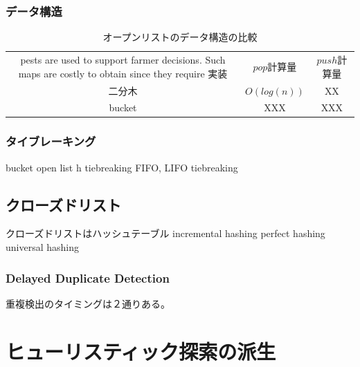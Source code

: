 \documentclass[b5paper]{report}
\begin{document}
\subsection{データ構造}
\begin{table}
\caption{オープンリストのデータ構造の比較}
\label{tbl:open-list-data-structure}
\begin{adjustbox}{width=\textwidth}
\begin{tabular}{ccc}pests are used to
support farmer decisions. Such maps are costly to obtain since they require 
	実装			& $pop$計算量	& $push$計算量 \\
	二分木		& $O(log(n))$  	& XX \\
	bucket 		& XXX			& XXX \\
\end{tabular}
\end{adjustbox}
\end{table}

\subsection{タイブレーキング}
bucket open list
h tiebreaking
FIFO, LIFO tiebreaking


\section{クローズドリスト}
\label{sec:closed-list}

クローズドリストはハッシュテーブル
incremental hashing
perfect hashing
universal hashing


\subsection{Delayed Duplicate Detection}
重複検出のタイミングは２通りある。




\chapter{ヒューリスティック探索の派生}
\label{ch:heuristic-serach-variants}
\end{document}

